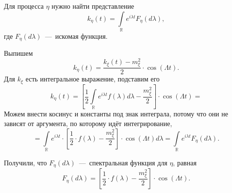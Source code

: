 Для процесса $ \eta $ нужно найти представление
\begin{equation*}
  k_{ \eta } \left( t \right) =
  \int \limits_{ \mathbb{R}} e^{i \lambda t} F_{ \eta } \left( d \lambda \right),
\end{equation*}
где $F_{ \eta } \left( d \lambda \right) $~---~искомая функция.

Выпишем
\begin{equation*}
  k_{ \eta } \left( t \right) =
  \frac{k_{ \xi } \left( t \right) - m_{ \xi }^2}{2} \cdot \cos \left( \Lambda t \right).
\end{equation*}
Для $k_{ \xi }$ есть интегральное выражение, подставим его
\begin{equation*}
  k_{ \eta } \left( t \right) =
  \left[
    \frac{1}{2} \int \limits_{ \mathbb{R}} e^{i \lambda t} f \left( \lambda \right) d \lambda -
    \frac{m_{ \xi }^2}{2} \right] \cdot \cos \left( \Lambda t \right) =
\end{equation*}
Можем внести косинус и константы под знак интеграла, потому что они не зависят от аргумента,
по которому идёт интегрирование,
\begin{equation*}
  = \int \limits_{ \mathbb{R}}
    e^{i \lambda t} \cdot
    \left[ \frac{1}{2} \cdot f \left( \lambda \right) - \frac{m_{ \xi }^2}{2} \right] \cdot
    \cos \left( \Lambda t \right) d \lambda =
  \int \limits_{ \mathbb{R}} e^{i \lambda t} F_{ \eta } \left( d \lambda \right).
\end{equation*}

Получили, что $F_{ \eta } \left( d \lambda \right) $~---~спектральная функция для $ \eta $, равная
\begin{equation*}
  F_{ \eta } \left( d \lambda \right) =
  \left[ \frac{1}{2} \cdot f \left( \lambda \right) - \frac{m_{ \xi }^2}{2} \right] \cdot
  \cos \left( \Lambda t \right).
\end{equation*}
